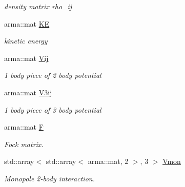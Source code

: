 \begin{DoxyCompactItemize}
\begin{DoxyCompactList}\small\item\em density matrix rho\+\_\+ij \end{DoxyCompactList}\item 
\mbox{\label{classHartreeFock_aa30fe3bd6fa480cc21b85a830013c9fe}} 
arma\+::mat \hyperlink{classHartreeFock_aa30fe3bd6fa480cc21b85a830013c9fe}{KE}
\begin{DoxyCompactList}\small\item\em kinetic energy \end{DoxyCompactList}\item 
\mbox{\label{classHartreeFock_ae823da58505b21231d092b3ef7cec3bf}} 
arma\+::mat \hyperlink{classHartreeFock_ae823da58505b21231d092b3ef7cec3bf}{Vij}
\begin{DoxyCompactList}\small\item\em 1 body piece of 2 body potential \end{DoxyCompactList}\item 
\mbox{\label{classHartreeFock_a25a0f38a655064375765f74182ce9334}} 
arma\+::mat \hyperlink{classHartreeFock_a25a0f38a655064375765f74182ce9334}{V3ij}
\begin{DoxyCompactList}\small\item\em 1 body piece of 3 body potential \end{DoxyCompactList}\item 
\mbox{\label{classHartreeFock_a45136295f4834a9f692f262eee75672a}} 
arma\+::mat \hyperlink{classHartreeFock_a45136295f4834a9f692f262eee75672a}{F}
\begin{DoxyCompactList}\small\item\em Fock matrix. \end{DoxyCompactList}\item 
\mbox{\label{classHartreeFock_aa007e1dc1d1fc8f4a24b42fc82ff277b}} 
std\+::array$<$ std\+::array$<$ arma\+::mat, 2 $>$, 3 $>$ \hyperlink{classHartreeFock_aa007e1dc1d1fc8f4a24b42fc82ff277b}{Vmon}
\begin{DoxyCompactList}\small\item\em Monopole 2-\/body interaction. \end{DoxyCompactList}\item 

\end{DoxyCompactItemize}
